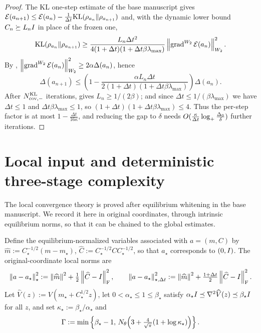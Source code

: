 \begin{proof}
The KL one-step estimate of the base manuscript gives
$\mathcal{E}(a_{n+1})\leq\mathcal{E}(a_n)-\tfrac1{\Delta t}\mathrm{KL}(\rho_{a_n}\|\rho_{a_{n+1}})$ and, with the
dynamic lower bound $C_n\succeq L_nI$ in place of the frozen one,
\[
    \mathrm{KL}(\rho_{a_n}\|\rho_{a_{n+1}})
    \geq
    \frac{L_n\Delta t^2}{4(1+\Delta t)(1+\Delta t\beta\lambda_{\max})}
    \left\lVert \operatorname{grad}^{W_2}\mathcal{E}(a_n)\right\rVert_{W_2}^2 .
\]
By , $\left\lVert \operatorname{grad}^{W_2}\mathcal{E}(a_n)\right\rVert_{W_2}^2\geq2\alpha\Delta(a_n)$, hence
\[
    \Delta(a_{n+1})
    \leq
    \left(
        1-\frac{\alpha L_n\Delta t}{2(1+\Delta t)(1+\Delta t\beta\lambda_{\max})}
    \right)\Delta(a_n).
\]
After $N_{\mathrm{cov},-}^{\mathrm{KL}}$ iterations,  gives $L_n\geq1/(2\beta)$; and since
$\Delta t\leq1/(\beta\lambda_{\max})$ we have $\Delta t\leq1$ and $\Delta t\beta\lambda_{\max}\leq1$, so
$(1+\Delta t)(1+\Delta t\beta\lambda_{\max})\leq4$. Thus the per-step factor is at most
$1-\tfrac{\Delta t}{16\kappa}$, and reducing the gap to $\delta$ needs
$O(\tfrac\kappa{\Delta t}\log_+\tfrac{\Delta_0}{\delta})$ further iterations.
\end{proof}

\section{Local input and deterministic three-stage complexity}

The local convergence theory is proved after equilibrium whitening in the base
manuscript. We record it here in original coordinates, through intrinsic equilibrium
norms, so that it can be chained to the global estimates.

Define the equilibrium-normalized variables associated with $a=(m,C)$ by
$\widehat m:=C_\star^{-1/2}(m-m_\star)$, $\widehat C:=C_\star^{-1/2}CC_\star^{-1/2}$, so that
$a_\star$ corresponds to $(0,I)$. The original-coordinate local norms are
\begin{equation}
\label{eq:local-norms}
    \left\lVert a-a_\star\right\rVert_\star^2
    :=
    \left\lVert \widehat m\right\rVert^2+\tfrac12\left\lVert \widehat C-I\right\rVert_{\mathrm{F}}^2,
    \qquad
    \left\lVert a-a_\star\right\rVert_{\star,\Delta t}^2
    :=
    \left\lVert \widehat m\right\rVert^2+\tfrac{1+\Delta t}2\left\lVert \widehat C-I\right\rVert_{\mathrm{F}}^2 .
\end{equation}
Let $\widehat V(z):=V(m_\star+C_\star^{1/2}z)$, let $0<\alpha_\star\leq1\leq\beta_\star$ satisfy
$\alpha_\star I\preceq\nabla^2\widehat V(z)\preceq\beta_\star I$ for all $z$, and set
$\kappa_\star:=\beta_\star/\alpha_\star$ and
\begin{equation}
\label{eq:Gamma}
    \Gamma
    :=
    \min\left\{
        \beta_\star-1,\,
        N_\theta\Bigl(3+\tfrac4{\sqrt\pi}(1+\log\kappa_\star)\Bigr)
    \right\}.
\end{equation}

